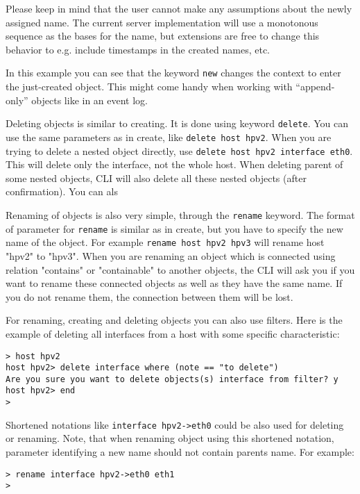 \documentclass[deska]{subfiles}
\begin{document}
Please keep in mind that the user cannot make any assumptions about the newly assigned name.  The current server
implementation will use a monotonous sequence as the bases for the name, but extensions are free to change this behavior
to e.g. include timestamps in the created names, etc.

In this example you can see that the keyword {\tt new} changes the context to enter the just-created object.  This might
come handy when working with ``append-only'' objects like in an event log.

Deleting objects is similar to creating. It is done using keyword {\tt delete}. You can use the same parameters as in
create, like {\tt delete host hpv2}. When you are trying to delete a nested object directly, use {\tt delete host hpv2 interface
eth0}. This will delete only the interface, not the whole host. When deleting parent of some nested objects, CLI will
also delete all these nested objects (after confirmation). You can als

Renaming of objects is also very simple, through the {\tt rename} keyword. The format of
parameter for {\tt rename} is similar as in create, but you have to specify the new name of the object. For example
{\tt rename host hpv2 hpv3} will rename host "hpv2" to "hpv3". When you are renaming an object which is connected using relation
"contains" or "containable" to another objects, the CLI will ask you if you want to rename these connected objects
as well as they have the same name. If you do not rename them, the connection between them will be lost.

For renaming, creating and deleting objects you can also use filters. Here is the example of deleting all interfaces from
a host with some specific characteristic:

\begin{verbatim}
> host hpv2
host hpv2> delete interface where (note == "to delete")
Are you sure you want to delete objects(s) interface from filter? y
host hpv2> end
>
\end{verbatim}

Shortened notations like {\tt interface hpv2->eth0} could be also used for deleting or renaming. Note, that when renaming
object using this shortened notation, parameter identifying a new name should not contain parents name. For example:

\begin{verbatim}
> rename interface hpv2->eth0 eth1
>
\end{verbatim}
\end{document}
